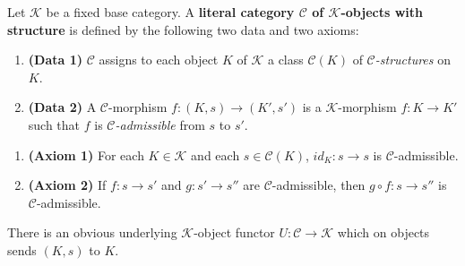 Let $\mathcal{K}$ be a fixed base category. A \textbf{literal category $\mathcal{C}$ of $\mathcal{K}$-objects with structure} is defined by the following two data and two axioms:

\begin{enumerate}
  \item \textbf{(Data 1)} $\mathcal{C}$ assigns to each object $K$ of $\mathcal{K}$ a class $\mathcal{C}(K)$ of \emph{$\mathcal{C}$-structures} on $K$.
  \item \textbf{(Data 2)} A $\mathcal{C}$-morphism $f: (K, s) \to (K', s')$ is a $\mathcal{K}$-morphism $f: K \to K'$ such that $f$ is \emph{$\mathcal{C}$-admissible} from $s$ to $s'$.
\end{enumerate}

\begin{enumerate}
  \item \textbf{(Axiom 1)} For each $K \in \mathcal{K}$ and each $s \in \mathcal{C}(K)$, $id_K: s \to s$ is $\mathcal{C}$-admissible.
  \item \textbf{(Axiom 2)} If $f: s \to s'$ and $g: s' \to s''$ are $\mathcal{C}$-admissible, then $g \circ f: s \to s''$ is $\mathcal{C}$-admissible.
\end{enumerate}

There is an obvious underlying $\mathcal{K}$-object functor $U: \mathcal{C} \to \mathcal{K}$ which on objects sends $(K, s)$ to $K$.
